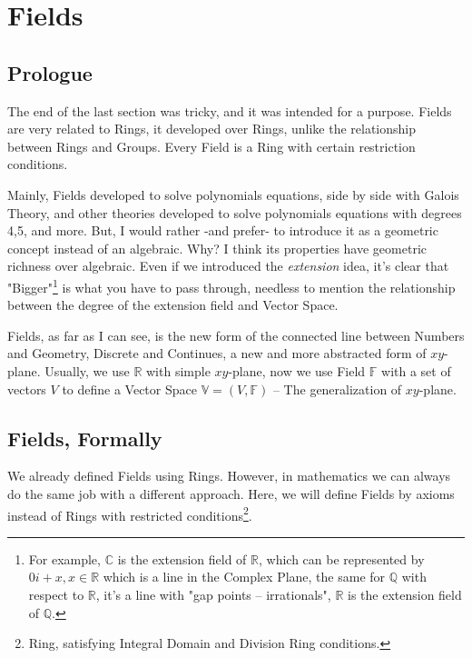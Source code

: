\section{Fields \label{fields}}

\subsection{Prologue}
The end of the last section was tricky, and it was intended for a purpose. Fields are very related to Rings, it developed over Rings, unlike the relationship between Rings and Groups. Every Field is a Ring with certain restriction conditions.

Mainly, Fields developed to solve polynomials equations, side by side with Galois Theory, and other theories developed to solve polynomials equations with degrees 4,5, and more. But, I would rather -and prefer- to introduce it as a geometric concept instead of an algebraic. Why? I think its properties have geometric richness over algebraic. Even if we introduced the {\it extension} idea, it's clear that "Bigger"\footnote{For example, $\mathbb{C}$ is the extension field of $\mathbb{R}$, which can be represented by $0i+x, x \in \mathbb{R}$ which is a line in the Complex Plane, the same for $\mathbb{Q}$ with respect to $\mathbb{R}$, it's a line with "gap points -- irrationals", $\mathbb{R}$ is the extension field of $\mathbb{Q}$.  } is what you have to pass through, needless to mention the relationship between the degree of the extension field and Vector Space.

Fields, as far as I can see, is the new form of the connected line between Numbers and Geometry, Discrete and Continues, a new and more abstracted form of $xy$-plane. Usually, we use $\mathbb{R}$ with simple $xy$-plane, now we use Field $\mathbb{F}$ with a set of vectors $V$ to define a Vector Space $\mathbb{V}= (V, \mathbb{F})$ -- The generalization of $xy$-plane.

\subsection{Fields, Formally}
We already defined Fields using Rings. However, in mathematics we can always do the same job with a different approach. Here, we will define Fields by axioms instead of Rings with restricted conditions\footnote{Ring, satisfying Integral Domain and Division Ring conditions.}.


